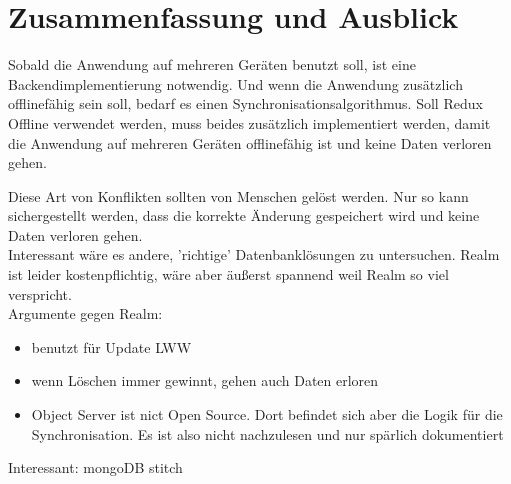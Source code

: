 \chapter{\label{chap:fazit}Zusammenfassung und Ausblick}

Sobald die Anwendung auf mehreren Geräten benutzt soll, ist eine Backendimplementierung notwendig.
Und wenn die Anwendung zusätzlich offlinefähig sein soll, bedarf es einen Synchronisationsalgorithmus.
Soll Redux Offline verwendet werden, muss beides zusätzlich implementiert werden, damit die Anwendung auf mehreren Geräten offlinefähig ist und keine Daten verloren gehen.

Diese Art von Konflikten sollten von Menschen gelöst werden. Nur so kann sichergestellt werden, dass die korrekte Änderung gespeichert wird und keine Daten verloren gehen.\\
% 
% 
% 
 
Interessant wäre es andere, 'richtige' Datenbanklösungen zu untersuchen. 
Realm ist leider kostenpflichtig, wäre aber äußerst spannend weil Realm so viel verspricht.\\
Argumente gegen Realm:
\begin{itemize}
  \item benutzt für Update LWW
  \item wenn Löschen immer gewinnt, gehen auch Daten erloren
  \item Object Server ist nict Open Source. Dort befindet sich aber die Logik für die Synchronisation. Es ist also nicht nachzulesen und nur spärlich dokumentiert
\end{itemize}
% 
% 
% 
Interessant: mongoDB stitch ~\cite{stitch}